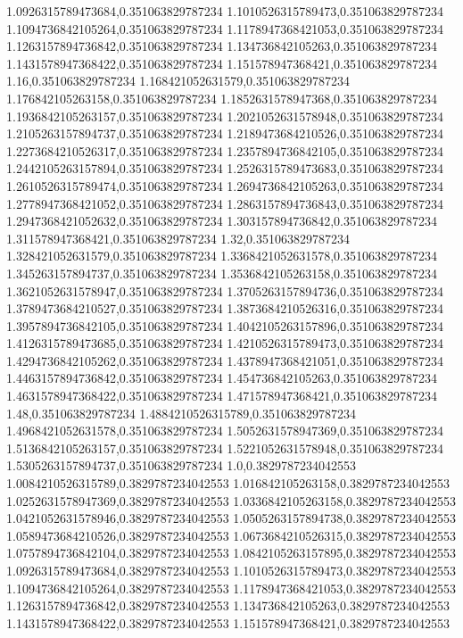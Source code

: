 1.0926315789473684,0.351063829787234
1.1010526315789473,0.351063829787234
1.1094736842105264,0.351063829787234
1.1178947368421053,0.351063829787234
1.1263157894736842,0.351063829787234
1.134736842105263,0.351063829787234
1.1431578947368422,0.351063829787234
1.151578947368421,0.351063829787234
1.16,0.351063829787234
1.168421052631579,0.351063829787234
1.176842105263158,0.351063829787234
1.1852631578947368,0.351063829787234
1.1936842105263157,0.351063829787234
1.2021052631578948,0.351063829787234
1.2105263157894737,0.351063829787234
1.2189473684210526,0.351063829787234
1.2273684210526317,0.351063829787234
1.2357894736842105,0.351063829787234
1.2442105263157894,0.351063829787234
1.2526315789473683,0.351063829787234
1.2610526315789474,0.351063829787234
1.2694736842105263,0.351063829787234
1.2778947368421052,0.351063829787234
1.2863157894736843,0.351063829787234
1.2947368421052632,0.351063829787234
1.303157894736842,0.351063829787234
1.311578947368421,0.351063829787234
1.32,0.351063829787234
1.328421052631579,0.351063829787234
1.3368421052631578,0.351063829787234
1.345263157894737,0.351063829787234
1.3536842105263158,0.351063829787234
1.3621052631578947,0.351063829787234
1.3705263157894736,0.351063829787234
1.3789473684210527,0.351063829787234
1.3873684210526316,0.351063829787234
1.3957894736842105,0.351063829787234
1.4042105263157896,0.351063829787234
1.4126315789473685,0.351063829787234
1.4210526315789473,0.351063829787234
1.4294736842105262,0.351063829787234
1.4378947368421051,0.351063829787234
1.4463157894736842,0.351063829787234
1.454736842105263,0.351063829787234
1.4631578947368422,0.351063829787234
1.471578947368421,0.351063829787234
1.48,0.351063829787234
1.4884210526315789,0.351063829787234
1.4968421052631578,0.351063829787234
1.5052631578947369,0.351063829787234
1.5136842105263157,0.351063829787234
1.5221052631578948,0.351063829787234
1.5305263157894737,0.351063829787234
1.0,0.3829787234042553
1.0084210526315789,0.3829787234042553
1.016842105263158,0.3829787234042553
1.0252631578947369,0.3829787234042553
1.0336842105263158,0.3829787234042553
1.0421052631578946,0.3829787234042553
1.0505263157894738,0.3829787234042553
1.0589473684210526,0.3829787234042553
1.0673684210526315,0.3829787234042553
1.0757894736842104,0.3829787234042553
1.0842105263157895,0.3829787234042553
1.0926315789473684,0.3829787234042553
1.1010526315789473,0.3829787234042553
1.1094736842105264,0.3829787234042553
1.1178947368421053,0.3829787234042553
1.1263157894736842,0.3829787234042553
1.134736842105263,0.3829787234042553
1.1431578947368422,0.3829787234042553
1.151578947368421,0.3829787234042553

